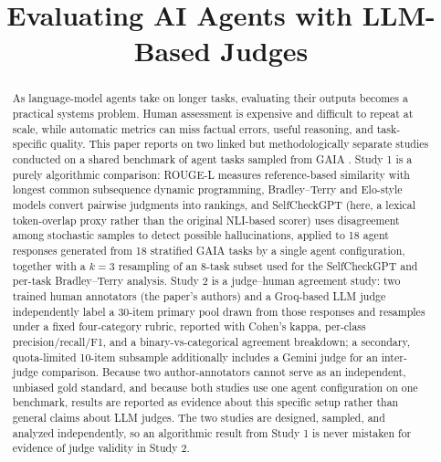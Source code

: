 \documentclass[conference]{IEEEtran}
\begin{document}
\title{Evaluating AI Agents with LLM-Based Judges}

\author{
\and
{}
}

\maketitle

\begin{abstract}
As language-model agents take on longer tasks, evaluating their outputs becomes a practical systems problem. Human assessment is expensive and difficult to repeat at scale, while automatic metrics can miss factual errors, useful reasoning, and task-specific quality. This paper reports on two linked but methodologically separate studies conducted on a shared benchmark of agent tasks sampled from GAIA \cite{mialon2023gaia}. Study 1 is a purely algorithmic comparison: ROUGE-L measures reference-based similarity with longest common subsequence dynamic programming, Bradley--Terry and Elo-style models convert pairwise judgments into rankings, and SelfCheckGPT (here, a lexical token-overlap proxy rather than the original NLI-based scorer) uses disagreement among stochastic samples to detect possible hallucinations, applied to 18 agent responses generated from 18 stratified GAIA tasks by a single agent configuration, together with a $k=3$ resampling of an 8-task subset used for the SelfCheckGPT and per-task Bradley--Terry analysis. Study 2 is a judge--human agreement study: two trained human annotators (the paper's authors) and a Groq-based LLM judge independently label a 30-item primary pool drawn from those responses and resamples under a fixed four-category rubric, reported with Cohen's kappa, per-class precision/recall/F1, and a binary-vs-categorical agreement breakdown; a secondary, quota-limited 10-item subsample additionally includes a Gemini judge for an inter-judge comparison. Because two author-annotators cannot serve as an independent, unbiased gold standard, and because both studies use one agent configuration on one benchmark, results are reported as evidence about this specific setup rather than general claims about LLM judges. The two studies are designed, sampled, and analyzed independently, so an algorithmic result from Study 1 is never mistaken for evidence of judge validity in Study 2.
\end{abstract}
\end{document}
